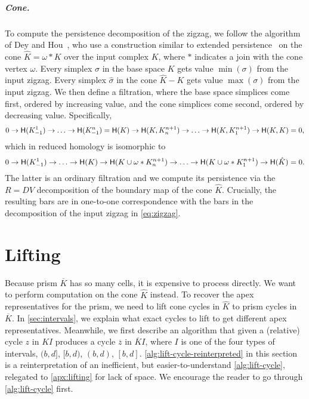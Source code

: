 \documentclass[cleveref,a4paper,english,nolineno]{socg-lipics-v2021}
\renewcommand{\paragraph}[1]{\subparagraph*{#1}}
\newcommand{\Hgr}{{\sf H}}
\newcommand{\prism}[1]{\overline{#1}}
\newcommand{\cone}[1]{\hat{#1}}
\newcommand{\pK}{\prism{K}}
\newcommand{\cK}{\cone{K}}
\newcommand{\pz}{\prism{z}}
\newcommand{\subK}[1]{K_{-1}^{#1}}
\newcommand{\supK}[1]{K_{#1}^{n+1}}
\newcommand{\ssx}{\sigma}
\newcommand{\cssx}{\cone{\ssx}}
\begin{document}
\paragraph{Cone.}
To compute the persistence decomposition of the zigzag, we follow the algorithm
of Dey and Hou~\cite{DH22}, who use a construction similar to extended
persistence~\cite{CEH09} on the cone $\cK = \omega * K$ over the input complex $K$,
where $*$ indicates a join with the cone vertex $\omega$.
Every simplex $\ssx$ in the base space $K$ gets value $\min(\ssx)$ from the
input zigzag. Every simplex $\cssx$ in the cone $\cK - K$ gets value
$\max(\ssx)$ from the input zigzag. We then define a filtration, where the base
space simplices come first, ordered by increasing value, and the cone simplices
come second, ordered by decreasing value.  Specifically,
\[
    0 \to \Hgr(\subK{1}) \to \ldots \to \Hgr(\subK{n}) = \Hgr(K) \to
    \Hgr(K, \supK{n}) \to \ldots \to \Hgr(K, \supK{1})
    \to \Hgr(K,K) = 0,
\]
which in reduced homology is isomorphic to
\begin{equation}
    \label{eq:cone-filtration}
    0 \to \Hgr(\subK{1}) \to \ldots \to \Hgr(K) \to
    \Hgr(K \cup \omega * \supK{n}) \to \ldots \to
    \Hgr(K \cup \omega * \supK{1}) \to \Hgr(\cK) = 0.
\end{equation}
The latter is an ordinary filtration and we compute its persistence via
the $R = DV$ decomposition of the boundary map of the cone $\cK$.
Crucially, the resulting bars are in one-to-one correspondence with the bars in
the decomposition of the input zigzag in \cref{eq:zigzag}.



\section{Lifting}
\label{sec:lifting}

Because prism $\pK$ has so many cells, it is expensive to process directly. We want to
perform computation on the cone $\cK$ instead. To recover the apex representatives for
the prism, we need to lift cone cycles in $\cK$ to prism cycles in $\pK$. In \cref{sec:intervals}, we
explain what exact cycles to lift to get different apex representatives.
Meanwhile, we first describe an algorithm that given a (relative) cycle $z$ in
$KI$ produces a cycle $\pz$ in $\pK I$, where $I$ is one of the four types of
intervals, $(b,d]$, $[b,d)$, $(b,d)$, $[b,d]$.
\cref{alg:lift-cycle-reinterpreted} in this section is a reinterpretation of an
inefficient, but easier-to-understand \cref{alg:lift-cycle}, relegated to
\cref{apx:lifting} for lack of space. We encourage the reader to go through
\cref{alg:lift-cycle} first.
\end{document}
